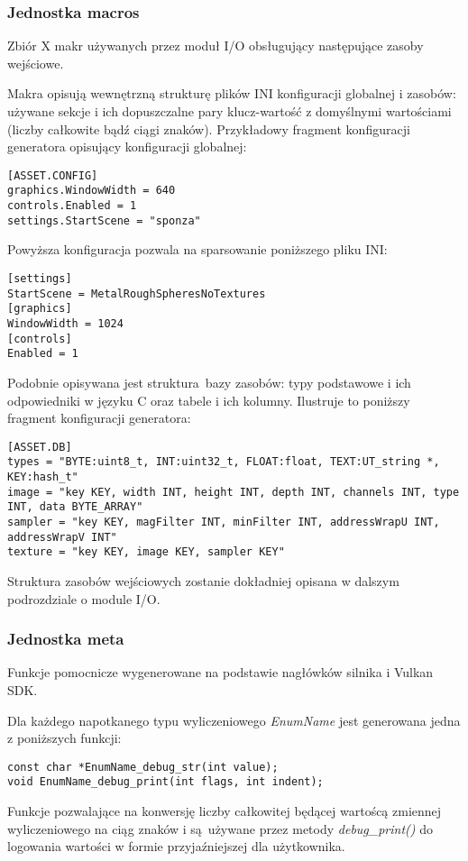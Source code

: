 \subsubsection{Jednostka macros}
Zbiór X makr używanych przez moduł I/O obsługujący następujące zasoby wejściowe.

Makra opisują wewnętrzną strukturę plików INI konfiguracji globalnej i zasobów: używane sekcje i ich dopuszczalne pary klucz-wartość z domyślnymi wartościami (liczby całkowite bądź ciągi znaków).
Przykładowy fragment konfiguracji generatora opisujący konfiguracji globalnej:
\begin{verbatim}
[ASSET.CONFIG]
graphics.WindowWidth = 640
controls.Enabled = 1
settings.StartScene = "sponza"
\end{verbatim}
Powyższa konfiguracja pozwala na sparsowanie poniższego pliku INI:
\begin{verbatim}
[settings]
StartScene = MetalRoughSpheresNoTextures
[graphics]
WindowWidth = 1024
[controls]
Enabled = 1 
\end{verbatim}

Podobnie opisywana jest struktura bazy zasobów: typy podstawowe i ich odpowiedniki w języku C oraz tabele i ich kolumny. Ilustruje to poniższy fragment konfiguracji generatora:
\begin{verbatim}
[ASSET.DB]
types = "BYTE:uint8_t, INT:uint32_t, FLOAT:float, TEXT:UT_string *, KEY:hash_t"
image = "key KEY, width INT, height INT, depth INT, channels INT, type INT, data BYTE_ARRAY"
sampler = "key KEY, magFilter INT, minFilter INT, addressWrapU INT, addressWrapV INT"
texture = "key KEY, image KEY, sampler KEY"
\end{verbatim}

Struktura zasobów wejściowych zostanie dokładniej opisana w dalszym podrozdziale o module I/O. 

\subsubsection{Jednostka meta}
Funkcje pomocnicze wygenerowane na podstawie nagłówków silnika i Vulkan SDK.

Dla każdego napotkanego typu wyliczeniowego \textit{EnumName} jest generowana jedna z poniższych funkcji:
\lstset{language=C}
\begin{lstlisting}
const char *EnumName_debug_str(int value);
void EnumName_debug_print(int flags, int indent);
\end{lstlisting}
Funkcje pozwalające na konwersję liczby całkowitej będącej wartoścą zmiennej wyliczeniowego na ciąg znaków i są używane przez metody \textit{debug\_print()} do logowania wartości w formie przyjaźniejszej dla użytkownika.

